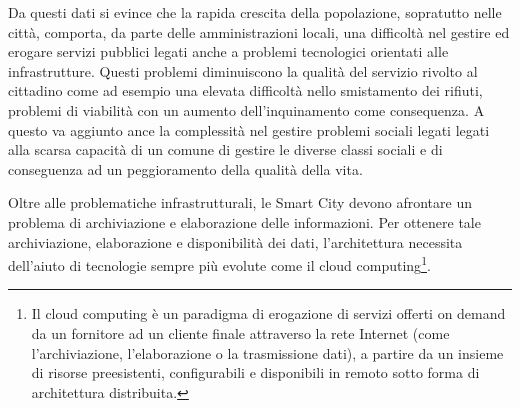 Da questi dati si evince che la rapida crescita della popolazione, sopratutto nelle città, comporta, da parte delle amministrazioni locali, una difficoltà nel gestire ed erogare servizi pubblici legati anche a problemi tecnologici orientati alle infrastrutture. Questi problemi diminuiscono la qualità del servizio rivolto al cittadino come ad esempio una elevata difficoltà nello smistamento dei rifiuti, problemi di viabilità con un aumento dell'inquinamento come consequenza. A questo va aggiunto ance la complessità nel gestire problemi sociali legati legati alla scarsa capacità di un comune di gestire le diverse classi sociali e di conseguenza ad un peggioramento della qualità della vita.\cite{What_make_city_smart}

Oltre alle problematiche infrastrutturali, le Smart City devono afrontare un problema di archiviazione e elaborazione delle informazioni. Per ottenere tale archiviazione, elaborazione e disponibilità dei dati, l'architettura necessita dell'aiuto di tecnologie sempre più evolute come il cloud computing\footnote{Il cloud computing è un paradigma di erogazione di servizi offerti on demand da un fornitore ad un cliente finale attraverso la rete Internet (come l'archiviazione, l'elaborazione o la trasmissione dati), a partire da un insieme di risorse preesistenti, configurabili e disponibili in remoto sotto forma di architettura distribuita.}.\cite{smart_problem_bigdata_1} \cite{smart_problem_bigdata_2}

